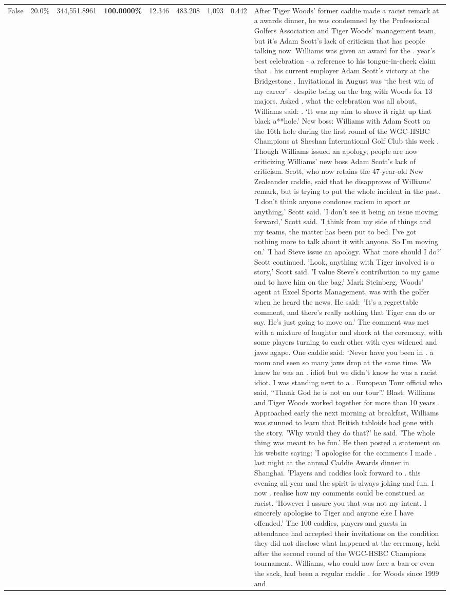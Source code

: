 \begin{table}[H]
\begin{tabular}{lllrlllll}
False & 20.0\% & 344,551.8961 & \bfseries \color{red} 100.0000\% & 12.346 & 483.208 & 1,093 & 0.442 & After Tiger Woods' former caddie made a racist remark at a awards dinner, he was condemned by the Professional Golfers Association and Tiger Woods' management team, but it's Adam Scott's lack of criticism that has people talking now. Williams was given an award for the . year’s best celebration - a reference to his tongue-in-cheek claim that . his current employer Adam Scott’s victory at the Bridgestone . Invitational in August was ‘the best win of my career’ - despite being on the bag with Woods for 13 majors. Asked . what the celebration was all about, Williams said: . ‘It was my aim to shove it right up that black a**hole.’ New boss: Williams with Adam Scott  on the 16th hole during the first round of the WGC-HSBC Champions at Sheshan International Golf Club this week . Though Williams issued an apology, people are now criticizing Williams' new boss Adam Scott's lack of criticism. Scott, who now retains the 47-year-old New Zealeander caddie, said that he disapproves of Williams' remark, but is trying to put the whole incident in the past. 'I don't think anyone condones racism in sport or anything,' Scott said. 'I don't see it being an issue moving forward,' Scott said. 'I think from my side of things and my teams, the matter has been put to bed. I've got nothing more to talk about it with anyone. So I'm moving on.' 'I had Steve issue an apology. What more should I do?' Scott continued. 'Look, anything with Tiger involved is a story,' Scott said. 'I value Steve's contribution to my game and to have him on the bag.' Mark Steinberg, Woods' agent at Excel Sports Management, was with the golfer when he heard the news. He said: 'It's a regrettable comment, and there's really nothing that Tiger can do or say. He's just going to move on.' The comment was met with a mixture of laughter and shock at the ceremony, with some players turning to each other with eyes widened and jaws agape. One caddie said: ‘Never have you been in . a room and seen so many jaws drop at the same time. We knew he was an . idiot but we didn’t know he was a racist idiot. I was standing next to a . European Tour official who said, “Thank God he is not on our tour”.’ Blast: Williams and Tiger Woods worked together for more than 10 years . Approached early the next morning at breakfast, Williams was stunned to learn that British tabloids had gone with the story. 'Why would they do that?' he said. 'The whole thing was meant to be fun.' He then posted a statement on his website saying: 'I apologise for the comments I made . last night at the annual Caddie Awards dinner in Shanghai. 'Players and caddies look forward to . this evening all year and the spirit is always joking and fun. I now . realise how my comments could be construed as racist. 'However I assure you that was not my intent. I sincerely apologise to Tiger and anyone else I have offended.' The 100 caddies, players and guests in attendance had accepted their invitations on the condition they did not disclose what happened at the ceremony, held after the second round of the WGC-HSBC Champions tournament. Williams, who could now face a ban or even the sack, had been a regular caddie . for Woods since 1999 and 
\end{tabular}
\end{table}

